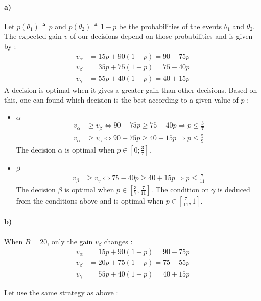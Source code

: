 \paragraph{a)}Let $p(\theta_1) \triangleq  p $ and $p(\theta_2) \triangleq  1-p $ be the probabilities of the events $\theta_1$ and $\theta_2$.  The expected gain $v$ of our decisions depend on those probabilities and is given by : 
\begin{align*}
    v_\alpha&= 15p + 90(1-p) = 90 - 75p\\
    v_\beta &= 35p + 75(1-p) = 75 - 40p\\
    v_\gamma&= 55p + 40(1-p) = 40 + 15p
\end{align*}
A decision is optimal when it gives a greater gain than other decisions. Based on this, one can found which decision is the best according to a given value of $p$ :
\begin{itemize}
    \item $\alpha$
    \begin{align*}
        v_\alpha &\geq  v_\beta \Leftrightarrow 90 - 75p \geq 75 -40 p \Rightarrow p\leq \frac{3}{7}\\
        v_\alpha &\geq  v_\gamma \Leftrightarrow 90 - 75p \geq 40 +15p \Rightarrow p\leq \frac{5}{9}
    \end{align*}
    The decision $\alpha$ is optimal when $p \in [0;\frac{3}{7}]$.
    \item $\beta$
    \begin{align*}
       v_\beta &\geq  v_\gamma \Leftrightarrow 75 - 40p \geq 40 +15p \Rightarrow p\leq \frac{7}{11}
    \end{align*}
    The decision $\beta$ is optimal when $p \in [\frac{3}{7},\frac{7}{11}]$. \newline The condition on $\gamma$ is deduced from the conditions above and is optimal when $p \in [\frac{7}{11},1]$.
\end{itemize}

\paragraph{b)} When $B = 20$, only the gain $v_\beta$ changes : 
\begin{align*}
    v_\alpha&= 15p + 90(1-p) = 90 - 75p\\
    v_\beta &= 20p + 75(1-p) = 75 - 55p\\
    v_\gamma&= 55p + 40(1-p) = 40 + 15p
\end{align*}

Let use the same strategy as above : 

